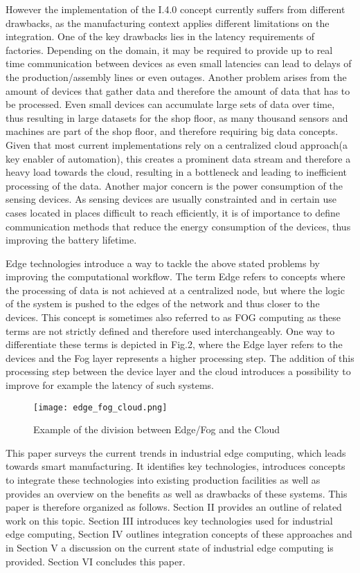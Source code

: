 However the implementation of the I.4.0 concept currently suffers from different drawbacks, as the manufacturing context applies different limitations on the integration. One of the key drawbacks lies in the latency requirements of factories. \cite{latency} Depending on the domain, it may be required to provide up to real time communication between devices as even small latencies can lead to delays of the production/assembly lines or even outages. Another problem arises from the amount of devices that gather data and therefore the amount of data that has to be processed. \cite{bigData} Even small devices can accumulate large sets of data over time, thus resulting in large datasets for the shop floor, as many thousand sensors and machines are part of the shop floor, and therefore requiring big data concepts. Given that most current implementations rely on a centralized cloud approach(a key enabler of automation), this creates a prominent data stream and therefore a heavy load towards the cloud, resulting in a bottleneck and leading to inefficient processing of the data. Another major concern is the power consumption of the sensing devices. \cite{fogDep} As sensing devices are usually constrainted and in certain use cases located in places difficult to reach efficiently, it is of importance to define communication methods that reduce the energy consumption of the devices, thus improving the battery lifetime.

Edge technologies introduce a way to tackle the above stated problems by improving the computational workflow. The term Edge refers to concepts where the processing of data is not achieved at a centralized node, but where the logic of the system is pushed to the edges of the network and thus closer to the devices. \cite{edgeDef} This concept is sometimes also referred to as FOG computing as these terms are not strictly defined and therefore used interchangeably. One way to differentiate these terms is depicted in Fig.2, where the Edge layer refers to the devices and the Fog layer represents a higher processing step. The addition of this processing step between the device layer and the cloud introduces a possibility to improve for example the latency of such systems.

\begin{figure}
	\centering
	\texttt{[image: edge\_fog\_cloud.png]}
	\caption{Example of the division between Edge/Fog and the Cloud}
\end{figure}

This paper surveys the current trends in industrial edge computing, which leads towards smart manufacturing. It identifies key technologies, introduces concepts to integrate these technologies into existing production facilities as well as provides an overview on the benefits as well as drawbacks of these systems. This paper is therefore organized as follows. Section II provides an outline of related work on this topic. Section III introduces key technologies used for industrial edge computing, Section IV outlines integration concepts of these approaches and in Section V a discussion on the current state of industrial edge computing is provided. Section VI concludes this paper.